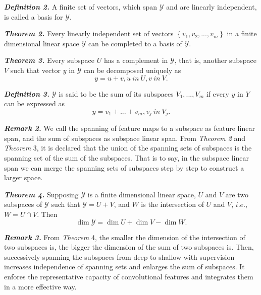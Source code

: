\documentclass[runningheads]{llncs}
\begin{document}
\textbf{\textit{Definition 2.} } A finite set of vectors, which span  $\mathcal{Y}$ and are linearly independent, is called a basis for $\mathcal{Y}$.

\textbf{\textit{Theorem 2. }} Every linearly independent set of vectors $\left\{ {{v_1},{v_2},...,{v_m}} \right\}$ in a finite dimensional linear space $\mathcal{Y}$ can be completed to a basis of $\mathcal{Y}$.

\textbf{\textit{Theorem 3.}}  Every subspace $U$ has a complement in $\mathcal{Y}$, that is, another subspace $V$ such that vector $y$ in $\mathcal{Y}$ can be decomposed uniquely as 
\begin{equation}
   y = u + v, u \ in \ U, v \ in \ V.
   \label{ls::theo3}
\end{equation}	  

\textbf{\textit{Definition 3.} } $\mathcal{Y}$ is said to be the sum of its subspaces $V_1,...,V_m$ if every $y$ in $Y$ can be expressed as
\begin{equation}
    y = v_1+...+v_m, v_j \  in \  V_j.
    \label{ls::def3}
\end{equation}

\textbf{\textit{Remark 2.}} We call the spanning of feature maps to a subspace as feature linear span, and the sum of subspaces as subspace linear span. From \textit{Theorem 2} and \textit{Theorem} 3, it is declared that the union of the spanning sets of subspaces is the spanning set of the sum of the subspaces. That is to say, in the subspace linear span we can merge the spanning sets of subspaces step by step to construct a larger space.

\textbf{\textit{Theorem 4.}} Supposing $\mathcal{Y}$ is a finite dimensional linear space, $U$ and $V$ are two subspaces of $\mathcal{Y}$ such that $\mathcal{Y} = U + V $, and $W$ is the intersection of $U$ and $V$, $i.e.$, $W = U \cap V $. 
Then
\begin{equation}
   \dim \mathcal{Y} = \dim U + \dim V - \dim W.
\end{equation}	   

\textbf{\textit{Remark 3.}} From \textit{Theorem} 4, the smaller the dimension of the intersection of two subspaces is, the bigger the dimension of the sum of two subspaces is. Then, successively spanning the subspaces from deep to shallow with supervision increases independence of spanning sets and enlarges the sum of subspaces. It enfores the representative capacity of convolutional features and integrates them in a more effective way. 
\end{document}
